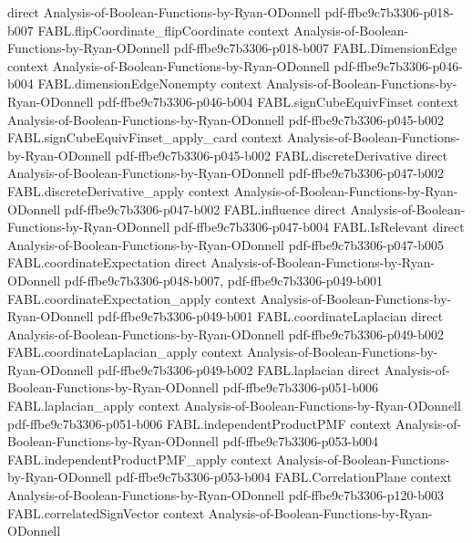 \begin{theorem}
  {direct}
  {Analysis-of-Boolean-Functions-by-Ryan-ODonnell}
  {pdf-ffbe9c7b3306-p018-b007}
\proofstep
  {FABL.flipCoordinate_flipCoordinate}
  {context}
  {Analysis-of-Boolean-Functions-by-Ryan-ODonnell}
  {pdf-ffbe9c7b3306-p018-b007}
\proofstep
  {FABL.DimensionEdge}
  {context}
  {Analysis-of-Boolean-Functions-by-Ryan-ODonnell}
  {pdf-ffbe9c7b3306-p046-b004}
\proofstep
  {FABL.dimensionEdgeNonempty}
  {context}
  {Analysis-of-Boolean-Functions-by-Ryan-ODonnell}
  {pdf-ffbe9c7b3306-p046-b004}
\proofstep
  {FABL.signCubeEquivFinset}
  {context}
  {Analysis-of-Boolean-Functions-by-Ryan-ODonnell}
  {pdf-ffbe9c7b3306-p045-b002}
\proofstep
  {FABL.signCubeEquivFinset_apply_card}
  {context}
  {Analysis-of-Boolean-Functions-by-Ryan-ODonnell}
  {pdf-ffbe9c7b3306-p045-b002}
\proofstep
  {FABL.discreteDerivative}
  {direct}
  {Analysis-of-Boolean-Functions-by-Ryan-ODonnell}
  {pdf-ffbe9c7b3306-p047-b002}
\proofstep
  {FABL.discreteDerivative_apply}
  {context}
  {Analysis-of-Boolean-Functions-by-Ryan-ODonnell}
  {pdf-ffbe9c7b3306-p047-b002}
\proofstep
  {FABL.influence}
  {direct}
  {Analysis-of-Boolean-Functions-by-Ryan-ODonnell}
  {pdf-ffbe9c7b3306-p047-b004}
\proofstep
  {FABL.IsRelevant}
  {direct}
  {Analysis-of-Boolean-Functions-by-Ryan-ODonnell}
  {pdf-ffbe9c7b3306-p047-b005}
\proofstep
  {FABL.coordinateExpectation}
  {direct}
  {Analysis-of-Boolean-Functions-by-Ryan-ODonnell}
  {pdf-ffbe9c7b3306-p048-b007,
    pdf-ffbe9c7b3306-p049-b001}
\proofstep
  {FABL.coordinateExpectation_apply}
  {context}
  {Analysis-of-Boolean-Functions-by-Ryan-ODonnell}
  {pdf-ffbe9c7b3306-p049-b001}
\proofstep
  {FABL.coordinateLaplacian}
  {direct}
  {Analysis-of-Boolean-Functions-by-Ryan-ODonnell}
  {pdf-ffbe9c7b3306-p049-b002}
\proofstep
  {FABL.coordinateLaplacian_apply}
  {context}
  {Analysis-of-Boolean-Functions-by-Ryan-ODonnell}
  {pdf-ffbe9c7b3306-p049-b002}
\proofstep
  {FABL.laplacian}
  {direct}
  {Analysis-of-Boolean-Functions-by-Ryan-ODonnell}
  {pdf-ffbe9c7b3306-p051-b006}
\proofstep
  {FABL.laplacian_apply}
  {context}
  {Analysis-of-Boolean-Functions-by-Ryan-ODonnell}
  {pdf-ffbe9c7b3306-p051-b006}
\proofstep
  {FABL.independentProductPMF}
  {context}
  {Analysis-of-Boolean-Functions-by-Ryan-ODonnell}
  {pdf-ffbe9c7b3306-p053-b004}
\proofstep
  {FABL.independentProductPMF_apply}
  {context}
  {Analysis-of-Boolean-Functions-by-Ryan-ODonnell}
  {pdf-ffbe9c7b3306-p053-b004}
\proofstep
  {FABL.CorrelationPlane}
  {context}
  {Analysis-of-Boolean-Functions-by-Ryan-ODonnell}
  {pdf-ffbe9c7b3306-p120-b003}
\proofstep
  {FABL.correlatedSignVector}
  {context}
  {Analysis-of-Boolean-Functions-by-Ryan-ODonnell}

\end{theorem}

